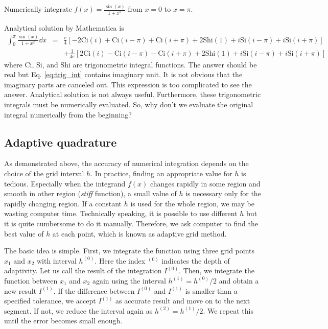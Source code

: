 \vspace{18px}
\noindent
\exercise
Numerically integrate $f(x)=\displaystyle\frac{\sin(x)}{1+x^2}$ from $x=0$ to $x=\pi$.

Analytical solution by Mathematica is
\begin{eqnarray}\label{eq:trig_int}
 \int_0^\pi \frac{\sin(x)}{1+x^2} \dd{x} &=&  \frac{e}{4} \left[-2 \text{Ci}(i)+\text{Ci}(i-\pi )+\text{Ci}(i+\pi )+2 \text{Shi}(1)+i \text{Si}(i-\pi )+i \text{Si}(i+\pi )\right ] \nonumber \\ 
	&&+\frac{1}{4e} \left [2 \text{Ci}(i)-\text{Ci}(i-\pi )-\text{Ci}(i+\pi )+2 \text{Shi}(1)+i \text{Si}(i-\pi )+i \text{Si}(i+\pi ) \right ]
\end{eqnarray}
where Ci, Si, and Shi are trigonometric integral functions.
The answer should be real but Eq. \ref{eq:trig_int} contains imaginary unit.  It is not obvious that the imaginary parts are canceled out. This expression is too complicated to see the answer.  Analytical solution is not always useful.  Furthermore, these trigonometric integrals must be numerically evaluated.  So, why don't we evaluate the original integral numerically from the beginning? 

\subsection{Adaptive quadrature}

As demonstrated above, the accuracy of numerical integration depends on the choice of the grid interval $h$.  In practice, finding an appropriate value for $h$ is  tedious. Especially when the integrand $f(x)$ changes rapidly in some region and smooth in other region (\textit{stiff} function), a small value of $h$ is necessary only for the rapidly changing region.    If a constant $h$ is used for the whole region, we may be wasting computer time.   Technically speaking, it is possible to use different $h$ but it is quite cumbersome to do it manually.  Therefore, we ask computer to find the best value of $h$ at each point, which is known as adaptive grid method.

The basic idea is simple. First, we integrate the function using three grid points $x_1$ and $x_2$ with interval $h^{(0)}$.  Here the index $^{(0)}$ indicates the depth of adaptivity.  Let us call the result of the integration $I^{(0)}$.  Then, we integrate the function between $x_1$ and $x_2$ again using the interval $h^{(1)}=h^{(0)}/2$ and obtain a new result $I^{(1)}$.  If the difference between $I^{(0)}$ and $I^{(1)}$ is smaller than a specified tolerance, we accept $I^{(1)}$ as accurate result and move on to the next segment.  If not, we reduce the interval again as $h^{(2)}=h^{(1)}/2$.  We repeat this until the error becomes small enough.




